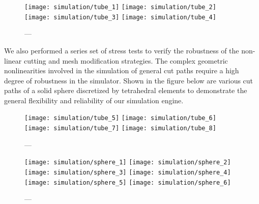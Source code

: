 \begin{figure}
  \centering%
	\texttt{[image: simulation/tube\_1]}\hfill%
	\texttt{[image: simulation/tube\_2]}\\[1.5ex]
	\texttt{[image: simulation/tube\_3]}\hfill%
	\texttt{[image: simulation/tube\_4]}\\
	\caption{---}\label{fig:tube}
\end{figure}

We also performed a series set of stress tests to verify the robustness of the non-linear cutting and mesh modification strategies. The complex geometric nonlinearities involved in the simulation of general cut paths require a high degree of robustness in the simulator. Shown in the figure below are various cut paths of a solid sphere discretized by tetrahedral elements to demonstrate the general flexibility and reliability of our simulation engine.

\begin{figure}
  \centering%
	\texttt{[image: simulation/tube\_5]}\hfill%
	\texttt{[image: simulation/tube\_6]}\hfill%
	\texttt{[image: simulation/tube\_7]}\hfill%
	\texttt{[image: simulation/tube\_8]}\\
	\caption{---}\label{fig:tube_stress}
\end{figure}

\begin{figure}
  \centering%
	\texttt{[image: simulation/sphere\_1]}\hfill%
	\texttt{[image: simulation/sphere\_2]}\\[1.5ex]
	\texttt{[image: simulation/sphere\_3]}\hfill%
	\texttt{[image: simulation/sphere\_4]}\\[1.5ex]
	\texttt{[image: simulation/sphere\_5]}\hfill%
	\texttt{[image: simulation/sphere\_6]}\\
	\caption{---}\label{fig:sphere}
\end{figure}

